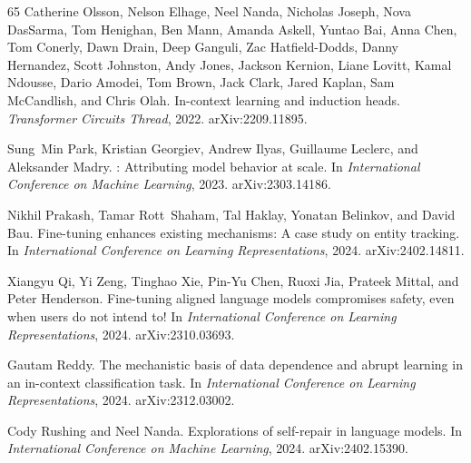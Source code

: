 \begin{thebibliography}{65}
Catherine Olsson, Nelson Elhage, Neel Nanda, Nicholas Joseph, Nova DasSarma,
  Tom Henighan, Ben Mann, Amanda Askell, Yuntao Bai, Anna Chen, Tom Conerly,
  Dawn Drain, Deep Ganguli, Zac Hatfield-Dodds, Danny Hernandez, Scott Johnston,
  Andy Jones, Jackson Kernion, Liane Lovitt, Kamal Ndousse, Dario Amodei,
  Tom Brown, Jack Clark, Jared Kaplan, Sam McCandlish, and Chris Olah.
\newblock In-context learning and induction heads.
\newblock \emph{Transformer Circuits Thread}, 2022.
\newblock arXiv:2209.11895.

Sung~Min Park, Kristian Georgiev, Andrew Ilyas, Guillaume Leclerc, and
  Aleksander Madry.
: Attributing model behavior at scale.
\newblock In \emph{International Conference on Machine Learning}, 2023.
\newblock arXiv:2303.14186.

Nikhil Prakash, Tamar Rott~Shaham, Tal Haklay, Yonatan Belinkov, and David Bau.
\newblock Fine-tuning enhances existing mechanisms: A case study on entity tracking.
\newblock In \emph{International Conference on Learning Representations}, 2024.
\newblock arXiv:2402.14811.

Xiangyu Qi, Yi Zeng, Tinghao Xie, Pin-Yu Chen, Ruoxi Jia, Prateek Mittal, and Peter Henderson.
\newblock Fine-tuning aligned language models compromises safety, even when users do not intend to!
\newblock In \emph{International Conference on Learning Representations}, 2024.
\newblock arXiv:2310.03693.

Gautam Reddy.
\newblock The mechanistic basis of data dependence and abrupt learning in an
  in-context classification task.
\newblock In \emph{International Conference on Learning Representations}, 2024.
\newblock arXiv:2312.03002.

Cody Rushing and Neel Nanda.
\newblock Explorations of self-repair in language models.
\newblock In \emph{International Conference on Machine Learning}, 2024.
\newblock arXiv:2402.15390.


\end{thebibliography}
